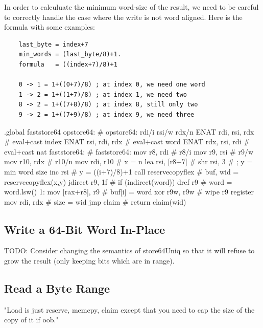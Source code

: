 In order to calculuate the minimum word-size of the result, we need to be
careful to correctly handle the case where the write is not word aligned.
Here is the formula with some examples:

\begin{verbatim}
    last_byte = index+7
    min_words = (last_byte/8)+1.
    formula   = ((index+7)/8)+1

    0 -> 1 = 1+((0+7)/8) ; at index 0, we need one word
    1 -> 2 = 1+((1+7)/8) ; at index 1, we need two
    8 -> 2 = 1+((7+8)/8) ; at index 8, still only two
    9 -> 2 = 1+((7+9)/8) ; at index 9, we need three
\end{verbatim}

\begin{asm}
.global faststore64
opstore64:                                  # opstore64: rdi/i rsi/w rdx/n
	ENAT	rdi, rsi, rdx               #   eval+cast index
	ENAT	rsi, rdi, rdx               #   eval+cast word
	ENAT	rdx, rsi, rdi               #   eval+cast nat
faststore64:                                # faststore64:
	mov	r8, rdi                     #   r8/i
	mov	r9, rsi                     #   r9/w
	mov	r10, rdx                    #   r10/n
	mov	rdi, r10                    #   x = n
	lea	rsi, [r8+7]                 #
	shr	rsi, 3                      #   ; y = min word size
	inc	rsi                         #   y = ((i+7)/8)+1
	call	reservecopyflex             #   buf, wid = reservecopyflex(x,y)
	jdirect	r9, 1f                      #   if (indirect(word))
	dref	r9                          #   word = word.lsw()
1:	mov	[rax+r8], r9                #   buf[i] = word
	xor	r9w, r9w                    #   wipe r9 register
	mov	rdi, rdx                    #   size = wid
	jmp	claim                       #   return claim(wid)
\end{asm}

\subsection{Write a 64-Bit Word In-Place}

TODO: Consider changing the semantics of store64Uniq so that it will
refuse to grow the result (only keeping bits which are in range).

\subsection{Read a Byte Range}

"Load is just reserve, memcpy, claim except that you need to cap the size
of the copy of it if oob."

